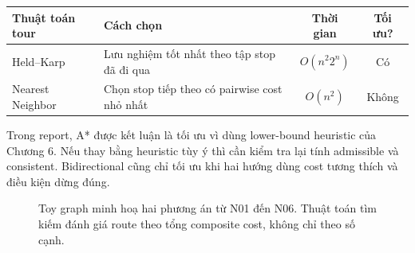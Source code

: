 \begin{center}
{\scriptsize
\begin{tabular}{l l c c}
\toprule
Thuật toán tour & Cách chọn & Thời gian & Tối ưu?\\
\midrule
Held--Karp & Lưu nghiệm tốt nhất theo tập stop đã đi qua & \(O(n^2 2^n)\) & Có\\
Nearest Neighbor & Chọn stop tiếp theo có pairwise cost nhỏ nhất & \(O(n^2)\) & Không\\
\bottomrule
\end{tabular}
}
\end{center}

Trong report, A* được kết luận là tối ưu vì dùng lower-bound heuristic của Chương 6. Nếu thay bằng heuristic tùy ý thì cần kiểm tra lại tính admissible và consistent. Bidirectional cũng chỉ tối ưu khi hai hướng dùng cost tương thích và điều kiện dừng đúng.

\begin{figure}[htbp]
\centering
{}
\caption{Toy graph minh hoạ hai phương án từ N01 đến N06. Thuật toán tìm kiếm đánh giá route theo tổng composite cost, không chỉ theo số cạnh.}
\label{fig:toy-search-graph}
\end{figure}
